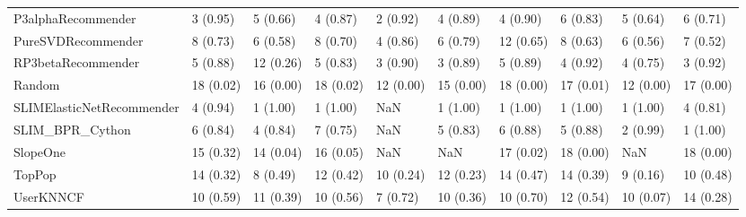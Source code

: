 \begin{tabular}{llllllllll}
                 P3alphaRecommender &                 3 (0.95) &    5 (0.66) &      4 (0.87) &     2 (0.92) &             4 (0.89) &            4 (0.90) &          6 (0.83) &           5 (0.64) &          6 (0.71) \\
                 PureSVDRecommender &                 8 (0.73) &    6 (0.58) &      8 (0.70) &     4 (0.86) &             6 (0.79) &           12 (0.65) &          8 (0.63) &           6 (0.56) &          7 (0.52) \\
                 RP3betaRecommender &                 5 (0.88) &   12 (0.26) &      5 (0.83) &     3 (0.90) &             3 (0.89) &            5 (0.89) &          4 (0.92) &           4 (0.75) &          3 (0.92) \\
                             Random &                18 (0.02) &   16 (0.00) &     18 (0.02) &    12 (0.00) &            15 (0.00) &           18 (0.00) &         17 (0.01) &          12 (0.00) &         17 (0.00) \\
          SLIMElasticNetRecommender &                 4 (0.94) &    1 (1.00) &      1 (1.00) &          NaN &             1 (1.00) &            1 (1.00) &          1 (1.00) &           1 (1.00) &          4 (0.81) \\
                    SLIM\_BPR\_Cython &                 6 (0.84) &    4 (0.84) &      7 (0.75) &          NaN &             5 (0.83) &            6 (0.88) &          5 (0.88) &           2 (0.99) &          1 (1.00) \\
                           SlopeOne &                15 (0.32) &   14 (0.04) &     16 (0.05) &          NaN &                  NaN &           17 (0.02) &         18 (0.00) &                NaN &         18 (0.00) \\
                             TopPop &                14 (0.32) &    8 (0.49) &     12 (0.42) &    10 (0.24) &            12 (0.23) &           14 (0.47) &         14 (0.39) &           9 (0.16) &         10 (0.48) \\
                          UserKNNCF &                10 (0.59) &   11 (0.39) &     10 (0.56) &     7 (0.72) &            10 (0.36) &           10 (0.70) &         12 (0.54) &          10 (0.07) &         14 (0.28) \\
\bottomrule
\end{tabular}
